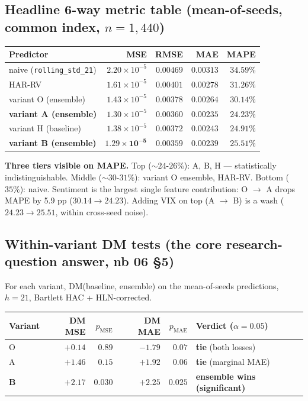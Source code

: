 \documentclass[11pt]{article}
\begin{document}
\subsection*{Headline 6-way metric table (mean-of-seeds, common index, $n = 1{,}440$)}

\begin{center}
\renewcommand{\arraystretch}{1.15}
\begin{tabular}{@{}lrrrr@{}}
\toprule
Predictor & MSE & RMSE & MAE & MAPE \\
\midrule
naive (\texttt{rolling\_std\_21})        & $2.20 \times 10^{-5}$ & $0.00469$ & $0.00313$ & $34.59\%$ \\
HAR-RV                                   & $1.61 \times 10^{-5}$ & $0.00401$ & $0.00278$ & $31.26\%$ \\
variant O (ensemble)                     & $1.43 \times 10^{-5}$ & $0.00378$ & $0.00264$ & $30.14\%$ \\
\textbf{variant A (ensemble)}            & $1.30 \times 10^{-5}$ & $0.00360$ & $\mathbf{0.00235}$ & $\mathbf{24.23\%}$ \\
variant H (baseline)                     & $1.38 \times 10^{-5}$ & $0.00372$ & $0.00243$ & $24.91\%$ \\
\textbf{variant B (ensemble)}            & $\mathbf{1.29 \times 10^{-5}}$ & $\mathbf{0.00359}$ & $0.00239$ & $25.51\%$ \\
\bottomrule
\end{tabular}
\end{center}

\textbf{Three tiers visible on MAPE.} Top ($\sim 24\text{-}26\%$): A, B, H --- statistically indistinguishable. Middle ($\sim 30\text{-}31\%$): variant O ensemble, HAR-RV. Bottom ($35\%$): naive. Sentiment is the largest single feature contribution: O $\to$ A drops MAPE by 5.9 pp ($30.14 \to 24.23$). Adding VIX on top (A $\to$ B) is a wash ($24.23 \to 25.51$, within cross-seed noise).

\subsection*{Within-variant DM tests (the core research-question answer, nb 06 \S 5)}

For each variant, DM(baseline, ensemble) on the mean-of-seeds predictions, $h = 21$, Bartlett HAC + HLN-corrected.

\begin{center}
\renewcommand{\arraystretch}{1.15}
\begin{tabular}{@{}lrrrrl@{}}
\toprule
Variant & DM MSE & $p_{\text{MSE}}$ & DM MAE & $p_{\text{MAE}}$ & Verdict ($\alpha = 0.05$) \\
\midrule
O          & $+0.14$ & $0.89$  & $-1.79$ & $0.07$  & \textbf{tie} (both losses) \\
A          & $+1.46$ & $0.15$  & $+1.92$ & $0.06$  & \textbf{tie} (marginal MAE) \\
\textbf{B} & $\mathbf{+2.17}$ & $\mathbf{0.030}$ & $\mathbf{+2.25}$ & $\mathbf{0.025}$ & \textbf{ensemble wins (significant)} \\
\bottomrule
\end{tabular}
\end{center}
\end{document}

